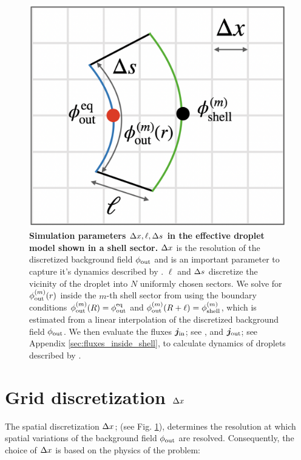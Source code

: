 \begin{figure}[tb]
\centering
\includegraphics[scale=0.27]{MainContent/Figures/schematics_simulation_parameters.pdf}
\caption{
\textbf{Simulation parameters $\Delta x, \ell, \Delta s$ in the effective droplet model shown in a shell sector.}
$\Delta x$ is the resolution of the discretized background field $\phi_\mathrm{out}$ and is an important parameter to capture it's dynamics described by . 
$\ell$ and $\Delta s$
discretize the vicinity of the droplet into $N$ uniformly chosen sectors.
We solve for $\phi_\mathrm{out}^{(m)}(r)$ inside the $m$-th shell sector from  using the boundary conditions $\phi_\mathrm{out}^{(m)}(R) = \phi^\mathrm{eq}_\mathrm{out}$ and $\phi_\mathrm{out}^{(m)}(R + \ell) = \phi_\mathrm{shell}^{(m)}$, which is estimated from a linear interpolation of the discretized background field $\phi_\mathrm{out}$.
We then evaluate the fluxes $\boldsymbol{j}_\mathrm{in}$; see , and $\boldsymbol{j}_\mathrm{out}$; see Appendix \ref{sec:fluxes_inside_shell}, to calculate dynamics of droplets described by . 
}
\label{fig:schematics_simulation_parameters}
\end{figure}

\section{Grid discretization $\Delta x$}

The spatial discretization $\Delta x$; (see Fig. \ref{fig:schematics_simulation_parameters}), determines the resolution at which spatial variations of the background field $\phi_\mathrm{out}$ are resolved.
Consequently, the choice of $\Delta x$ is based on the physics of the problem:

